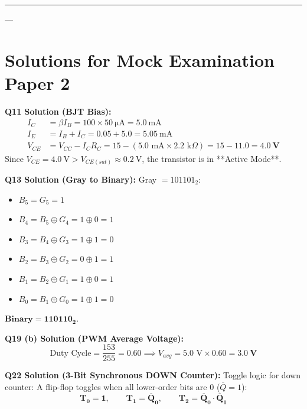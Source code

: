 \vspace{0.4cm}
\noindent\rule{\textwidth}{1.2pt}

---

\section{Solutions for Mock Examination Paper 2}

\begin{solutionbox}
\textbf{Q11 Solution (BJT Bias):}
\begin{align*}
    I_C &= \beta I_B = 100 \times \SI{50}{\micro\ampere} = \SI{5.0}{\milli\ampere} \\
    I_E &= I_B + I_C = 0.05 + 5.0 = \SI{5.05}{\milli\ampere} \\
    V_{CE} &= V_{CC} - I_C R_C = 15 - (5.0\text{ mA} \times 2.2\text{ k}\Omega) = 15 - 11.0 = \mathbf{\SI{4.0}{\volt}}
\end{align*}
Since $V_{CE} = \SI{4.0}{\volt} > V_{CE(sat)} \approx \SI{0.2}{\volt}$, the transistor is in **Active Mode**.

\vspace{6pt}
\textbf{Q13 Solution (Gray to Binary):}
Gray $= 101101_2$:
\begin{itemize}
    \item $B_5 = G_5 = 1$
    \item $B_4 = B_5 \oplus G_4 = 1 \oplus 0 = 1$
    \item $B_3 = B_4 \oplus G_3 = 1 \oplus 1 = 0$
    \item $B_2 = B_3 \oplus G_2 = 0 \oplus 1 = 1$
    \item $B_1 = B_2 \oplus G_1 = 1 \oplus 0 = 1$
    \item $B_0 = B_1 \oplus G_0 = 1 \oplus 1 = 0$
\end{itemize}
$\mathbf{\text{Binary} = 110110_2}$.

\vspace{6pt}
\textbf{Q19 (b) Solution (PWM Average Voltage):}
$$\text{Duty Cycle} = \frac{153}{255} = 0.60 \implies V_{avg} = 5.0\text{ V} \times 0.60 = \mathbf{\SI{3.0}{\volt}}$$

\vspace{6pt}
\textbf{Q22 Solution (3-Bit Synchronous DOWN Counter):}
Toggle logic for down counter: A flip-flop toggles when all lower-order bits are $0$ ($\overline{Q} = 1$):
$$\mathbf{T_0 = 1, \qquad T_1 = \overline{Q}_0, \qquad T_2 = \overline{Q}_0 \cdot \overline{Q}_1}$$
\end{solutionbox}
